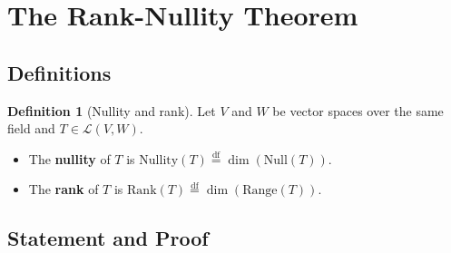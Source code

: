 \documentclass[11pt, a4paper, notitlepage]{report}
\theoremstyle{definition}
\newtheorem{definition}[theorem]{Definition}
\theoremstyle{remark}
\begin{document}
\section{The Rank-Nullity Theorem}
\label{sec:rank-nullity}

\subsection{Definitions}

\begin{definition}[Nullity and rank]\label{def:nullity-rank}
Let $V$ and $W$ be vector spaces over the same field and $T \in \mathcal{L}(V,W)$.
\begin{itemize}
  \item The \textbf{nullity} of $T$ is $\mathrm{Nullity}(T) \stackrel{\mathrm{df}}{=} \dim(\mathrm{Null}(T))$.
  \item The \textbf{rank} of $T$ is $\mathrm{Rank}(T) \stackrel{\mathrm{df}}{=} \dim(\mathrm{Range}(T))$.
\end{itemize}
\end{definition}

\subsection{Statement and Proof}
\end{document}
